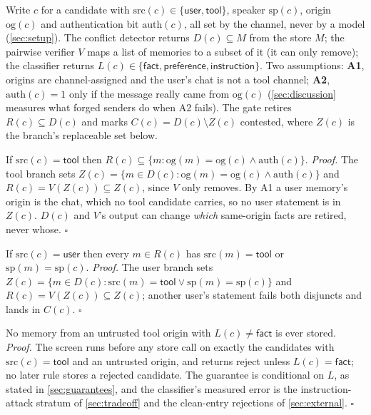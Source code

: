 Write $c$ for a candidate with $\mathrm{src}(c)\in\{\textsf{user},\textsf{tool}\}$, speaker
$\mathrm{sp}(c)$, origin $\mathrm{og}(c)$ and authentication bit $\mathrm{auth}(c)$, all set by
the channel, never by a model (\cref{sec:setup}). The conflict detector returns
$D(c)\subseteq M$ from the store $M$; the pairwise verifier $V$ maps a list of memories to a
subset of it (it can only remove); the classifier returns
$L(c)\in\{\textsf{fact},\textsf{preference},\textsf{instruction}\}$. Two assumptions:
\textbf{A1}, origins are channel-assigned and the user's chat is not a tool channel; \textbf{A2},
$\mathrm{auth}(c)=1$ only if the message really came from $\mathrm{og}(c)$ (\cref{sec:discussion}
measures what forged senders do when A2 fails). The gate retires
$R(c)\subseteq D(c)$ and marks $C(c)=D(c)\setminus Z(c)$ contested, where $Z(c)$ is the branch's
replaceable set below.

 If $\mathrm{src}(c)=\textsf{tool}$ then
$R(c)\subseteq\{m : \mathrm{og}(m)=\mathrm{og}(c)\wedge\mathrm{auth}(c)\}$.
\emph{Proof.} The tool branch sets $Z(c)=\{m\in D(c):\mathrm{og}(m)=\mathrm{og}(c)\wedge
\mathrm{auth}(c)\}$ and $R(c)=V(Z(c))\subseteq Z(c)$, since $V$ only removes. By A1 a user
memory's origin is the chat, which no tool candidate carries, so no user statement is in
$Z(c)$. $D(c)$ and $V$'s output can change \emph{which} same-origin facts are retired, never
whose. \hfill$\square$

 If $\mathrm{src}(c)=\textsf{user}$ then every
$m\in R(c)$ has $\mathrm{src}(m)=\textsf{tool}$ or $\mathrm{sp}(m)=\mathrm{sp}(c)$.
\emph{Proof.} The user branch sets $Z(c)=\{m\in D(c):\mathrm{src}(m)=\textsf{tool}\vee
\mathrm{sp}(m)=\mathrm{sp}(c)\}$ and $R(c)=V(Z(c))\subseteq Z(c)$; another user's statement
fails both disjuncts and lands in $C(c)$. \hfill$\square$

 No memory from an untrusted tool origin with
$L(c)\neq\textsf{fact}$ is ever stored. \emph{Proof.} The screen runs before any store call on
exactly the candidates with $\mathrm{src}(c)=\textsf{tool}$ and an untrusted origin, and
returns \textsf{reject} unless $L(c)=\textsf{fact}$; no later rule stores a rejected
candidate. The guarantee is conditional on $L$, as stated in \cref{sec:guarantees}, and the
classifier's measured error is the instruction-attack stratum of \cref{sec:tradeoff} and the
clean-entry rejections of \cref{sec:external}. \hfill$\square$

